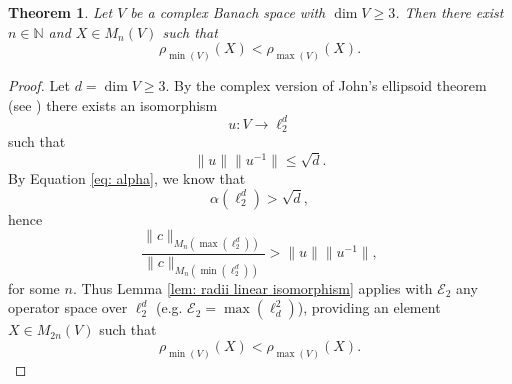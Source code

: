 \documentclass[12pt]{amsart}
\numberwithin{equation}{section}
\newtheorem{theorem}{Theorem}[section]
\theoremstyle{definition}
\newcommand{\cE}{\mathcal{E}}
\begin{document}
\begin{theorem} \label{thm:min_neq_max}
Let $V$ be a complex Banach space with $\dim V\geq 3$. Then there exist
$n\in\mathbb N$ and $X\in M_n(V)$ such that
  \[
    \rho_{\min(V)}(X)<\rho_{\max(V)}(X).
  \]
\end{theorem}


\begin{proof}
Let $d=\dim V\geq 3$. By the complex version of John's ellipsoid theorem (see \cite[Theorem 15.4]{TomczakJaegermann1989})
there exists an isomorphism
  \[
    u:V\to \ell_2^d
  \]
such that
  \[
    \|u\|\|u^{-1}\|\leq \sqrt d. 
  \]
By Equation \eqref{eq: alpha}, we know that
\[
\alpha(\ell_2^d)>\sqrt d,
\]
hence
\[
\frac{\|c\|_{M_{n}(\max(\ell_2^d))}}
     {\|c\|_{M_{n}(\min(\ell_2^d))}}
>
\|u\|\|u^{-1}\|, 
\]
for some $n$. 
Thus Lemma \ref{lem: radii linear isomorphism} applies with $\cE_2$ any operator space over $\ell_2^d$ (e.g. $\cE_2 = \max(\ell^2_d)$), providing an element $X\in M_{2n}(V)$ such that
\[
\rho_{\min(V)}(X)<\rho_{\max(V)}(X).
\]

\end{proof}
\end{document}
